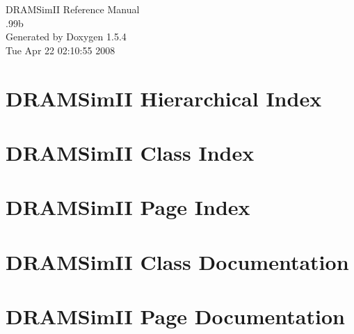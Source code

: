 \documentclass[a4paper]{book}
\begin{document}
\begin{titlepage}
\vspace*{7cm}
\begin{center}
{\Large DRAMSimII Reference Manual\\[1ex]\large .99b }\\
\vspace*{1cm}
{\large Generated by Doxygen 1.5.4}\\
\vspace*{0.5cm}
{\small Tue Apr 22 02:10:55 2008}\\
\end{center}
\end{titlepage}
\clearemptydoublepage
{}
\tableofcontents
\clearemptydoublepage
{}
\chapter{DRAMSimII Hierarchical Index}

\chapter{DRAMSimII Class Index}

\chapter{DRAMSimII Page Index}

\chapter{DRAMSimII Class Documentation}














\chapter{DRAMSimII Page Documentation}

\printindex
\end{document}
